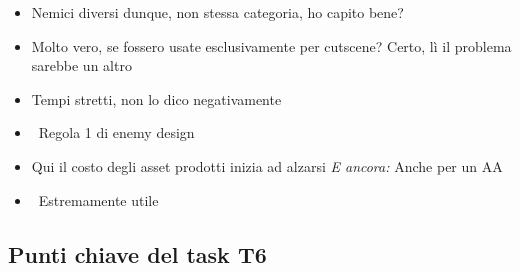 {\begin{itemize}
  \item {} Nemici diversi dunque, non stessa categoria, ho capito bene?
  \item {} Molto vero, se fossero usate esclusivamente per cutscene? Certo, lì il problema sarebbe un altro
  \item {} Tempi stretti, non lo dico negativamente
  \item {} \rvBene\ Regola 1 di enemy design
  \item {} Qui il costo degli asset prodotti inizia ad alzarsi \emph{E ancora:} Anche per un AA
  \item {} \rvBene\ Estremamente utile
\end{itemize}
}


\subsection{Punti chiave del task T6}
\label{rv:t6:sec:punti-chiave}

